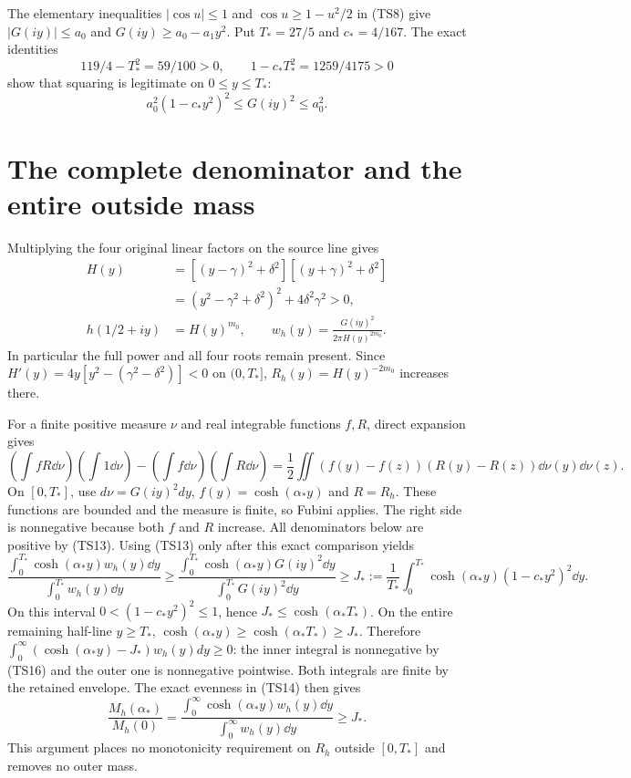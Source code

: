\documentclass[11pt,a4paper]{article}
\begin{document}
The elementary inequalities $|\cos u|\leq1$ and
$\cos u\geq1-u^2/2$ in (TS8) give
$|G(iy)|\leq a_0$ and $G(iy)\geq a_0-a_1y^2$.
Put $T_*=27/5$ and $c_*=4/167$. The exact identities
\[
 119/4-T_*^2=59/100>0,\qquad
 1-c_*T_*^2=1259/4175>0
\]
show that squaring is legitimate on $0\leq y\leq T_*$:
\begin{equation}\tag{TS13}
 a_0^2(1-c_*y^2)^2\leq G(iy)^2\leq a_0^2.
\end{equation}

\section{The complete denominator and the entire outside mass}
Multiplying the four original linear factors on the source line gives
\begin{equation}\tag{TS14}\begin{aligned}
 H(y)&=[(y-\gamma)^2+\delta^2][(y+\gamma)^2+\delta^2]\\
 &=(y^2-\gamma^2+\delta^2)^2+4\delta^2\gamma^2>0,\\
 h(1/2+iy)&=H(y)^{m_0},\qquad
 w_h(y)=\frac{G(iy)^2}{2\pi H(y)^{2m_0}}.
\end{aligned}\end{equation}
In particular the full power and all four roots remain present.
Since $H'(y)=4y[y^2-(\gamma^2-\delta^2)]<0$ on $(0,T_*]$,
$R_h(y)=H(y)^{-2m_0}$ increases there.

For a finite positive measure $\nu$ and real integrable functions
$f,R$, direct expansion gives
\begin{equation}\tag{TS15}
 \left(\int fR\dd\nu\right)\left(\int1\dd\nu\right)
 -\left(\int f\dd\nu\right)\left(\int R\dd\nu\right)
 =\frac12\iint(f(y)-f(z))(R(y)-R(z))\dd\nu(y)\dd\nu(z).
\end{equation}
On $[0,T_*]$, use $d\nu=G(iy)^2dy$, $f(y)=\cosh(\alpha_*y)$
and $R=R_h$. These functions are bounded and the measure is finite,
so Fubini applies. The right side is nonnegative because both
$f$ and $R$ increase. All denominators below are positive by (TS13).
Using (TS13) only after this exact comparison yields
\begin{equation}\tag{TS16}
 \frac{\int_0^{T_*}\cosh(\alpha_*y)w_h(y)\dd y}
      {\int_0^{T_*}w_h(y)\dd y}
 \geq\frac{\int_0^{T_*}\cosh(\alpha_*y)G(iy)^2\dd y}
              {\int_0^{T_*}G(iy)^2\dd y}
 \geq J_*:=\frac1{T_*}\int_0^{T_*}\cosh(\alpha_*y)(1-c_*y^2)^2\dd y.
\end{equation}
On this interval $0<(1-c_*y^2)^2\leq1$, hence
$J_*\leq\cosh(\alpha_*T_*)$. On the entire remaining half-line
$y\geq T_*$, $\cosh(\alpha_*y)\geq\cosh(\alpha_*T_*)\geq J_*$.
Therefore
$\int_0^\infty(\cosh(\alpha_*y)-J_*)w_h(y)dy\geq0$:
the inner integral is nonnegative by (TS16) and the outer one
is nonnegative pointwise. Both integrals are finite by the retained
envelope. The exact evenness in (TS14) then gives
\begin{equation}\tag{TS17}
 \frac{M_h(\alpha_*)}{M_h(0)}
 =\frac{\int_0^\infty\cosh(\alpha_*y)w_h(y)\dd y}
        {\int_0^\infty w_h(y)\dd y}\geq J_*.
\end{equation}
This argument places no monotonicity requirement on $R_h$ outside
$[0,T_*]$ and removes no outer mass.
\end{document}
